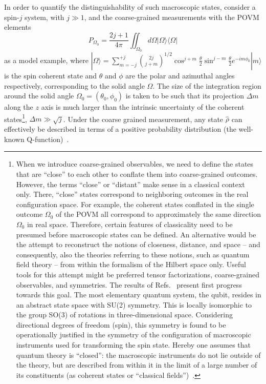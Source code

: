 \documentclass[12pt,a4]{article}
\begin{document}
In order to quantify the distinguishability of such macroscopic states, consider a spin-$j$ system, with $ j \gg 1$, and the coarse-grained measurements with the POVM elements
\begin{equation}
P_{\Omega_0}=\frac{2j+1}{4\pi} \iint_{\Omega_0} d\Omega |\Omega\rangle \langle \Omega|
\end{equation}
as a model example, where $|\Omega\rangle= \sum_{m=-j}^{+j} {2j \choose j+m}^{1/2} \cos^{j+m}\frac{\theta}{2} \sin^{j-m}\frac{\theta}{2} e^{-im\phi_0} |m\rangle $ is the spin coherent state and $\theta$ and $\phi$ are the polar and azimuthal angles respectively, corresponding to the solid angle $\Omega$. The size of the integration region around the solid angle $\Omega_0=(\theta_0, \phi_0)$ is taken to be such that its projection $\Delta m$ along the $z$ axis is much larger than the intrinsic uncertainty of the coherent states\footnote{When we introduce coarse-grained observables, we need to define the states that are ``close'' to each other to conflate them into coarse-grained outcomes. However, the terms ``close'' or ``distant'' make sense in a classical context only. There, ``close'' states correspond to neighboring outcomes in the real configuration space. For example, the coherent states conflated in the single outcome $\Omega_0$ of the POVM all correspond to approximately the same direction $\Omega_0$ in real space. Therefore, certain features of classicality need to be presumed before macroscopic states can be defined. An alternative would be the attempt to reconstruct the notions of closeness, distance, and space -- and consequently, also the theories referring to these notions, such as quantum field theory -- from within the formalism of the Hilbert space only. Useful tools for this attempt might be preferred tensor factorizations, coarse-grained observables, and symmetries. The results of Refs.~\cite{mueller,dakic} present first progress towards this goal. The most elementary quantum system, the qubit, resides in an abstract state space with SU(2) symmetry. This is locally isomorphic to the group SO(3) of rotations in three-dimensional space. Considering  directional degrees of freedom (spin), this symmetry is found to be operationally justified in the symmetry of the configuration of macroscopic instruments used for transforming the spin state. Hereby one assumes that quantum theory is ``closed'': the macroscopic instruments do not lie outside of the theory, but are described from within it in the limit of a large number of its constituents (as coherent states or ``classical fields'')~\cite{dakic}.}, $\Delta m \gg \sqrt{j}$. Under the coarse grained measurement, any state $\hat{\rho}$ can effectively be described in terms of a positive probability distribution (the well-known Q-function)~\cite{kofler}.
\end{document}
